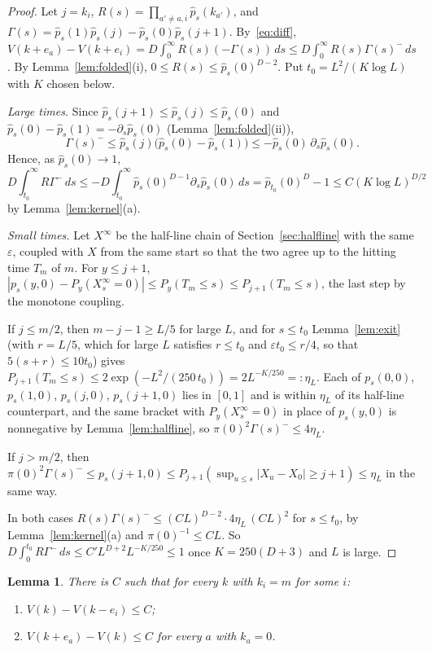 \documentclass[11pt]{amsart}
\newtheorem{lemma}[theorem]{Lemma}
\theoremstyle{remark}
\newcommand{\eps}{\varepsilon}
\begin{document}
\begin{proof}
Let $j=k_i$, $R(s)=\prod_{a'\ne a,i}\hat p_s(k_{a'})$, and
$\Gamma(s)=\hat p_s(1)\hat p_s(j)-\hat p_s(0)\hat p_s(j+1)$. By~\eqref{eq:diff},
$V(k+e_a)-V(k+e_i)=D\int_0^\infty R(s)(-\Gamma(s))\,ds\le D\int_0^\infty R(s)\Gamma(s)^-\,ds$. By
Lemma~\ref{lem:folded}(i), $0\le R(s)\le\hat p_s(0)^{D-2}$. Put $t_0=L^2/(K\log L)$ with $K$ chosen below.

\emph{Large times.} Since $\hat p_s(j+1)\le\hat p_s(j)\le\hat p_s(0)$ and $\hat p_s(0)-\hat p_s(1)=-\partial_s\hat p_s(0)$
(Lemma~\ref{lem:folded}(ii)),
\[
\Gamma(s)^-\le\hat p_s(j)\bigl(\hat p_s(0)-\hat p_s(1)\bigr)\le-\hat p_s(0)\,\partial_s\hat p_s(0).
\]
Hence, as $\hat p_s(0)\to1$,
\[
D\int_{t_0}^\infty R\Gamma^-\,ds\le-D\int_{t_0}^\infty\hat p_s(0)^{D-1}\partial_s\hat p_s(0)\,ds=\hat p_{t_0}(0)^D-1\le
C(K\log L)^{D/2}
\]
by Lemma~\ref{lem:kernel}(a).

\emph{Small times.} Let $X^\infty$ be the half-line chain of Section~\ref{sec:halfline} with the same $\eps$, coupled
with $X$ from the same start so that the two agree up to the hitting time $T_m$ of $m$. For $y\le j+1$,
$|p_s(y,0)-P_y(X^\infty_s=0)|\le P_y(T_m\le s)\le P_{j+1}(T_m\le s)$, the last step by the monotone coupling.

If $j\le m/2$, then $m-j-1\ge L/5$ for large $L$, and for $s\le t_0$ Lemma~\ref{lem:exit} (with $r=L/5$, which for large $L$ satisfies $r\le t_0$ and $\eps t_0\le r/4$,
so that $5(s+r)\le10t_0$) gives $P_{j+1}(T_m\le s)\le2\exp(-L^2/(250\,t_0))=2L^{-K/250}=:\eta_L$. Each of $p_s(0,0)$,
$p_s(1,0)$, $p_s(j,0)$, $p_s(j+1,0)$ lies in $[0,1]$ and is within $\eta_L$ of its half-line counterpart, and the
same bracket with $P_y(X^\infty_s=0)$ in place of $p_s(y,0)$ is nonnegative by Lemma~\ref{lem:halfline}, so $\pi(0)^2\Gamma(s)^-\le4\eta_L$.

If $j>m/2$, then $\pi(0)^2\Gamma(s)^-\le p_s(j+1,0)\le P_{j+1}(\sup_{u\le s}|X_u-X_0|\ge j+1)\le\eta_L$ in the same way.

In both cases $R(s)\Gamma(s)^-\le(CL)^{D-2}\cdot4\eta_L\,(CL)^2$ for $s\le t_0$, by Lemma~\ref{lem:kernel}(a) and
$\pi(0)^{-1}\le CL$. So $D\int_0^{t_0}R\Gamma^-\,ds\le C'L^{D+2}L^{-K/250}\le1$ once $K=250(D+3)$ and $L$ is large.
\end{proof}

\begin{lemma}\label{lem:B}
There is $C$ such that for every $k$ with $k_i=m$ for some $i$:
\begin{enumerate}
\item[(i)] $V(k)-V(k-e_i)\le C$;
\item[(ii)] $V(k+e_a)-V(k)\le C$ for every $a$ with $k_a=0$.
\end{enumerate}
\end{lemma}
\end{document}
